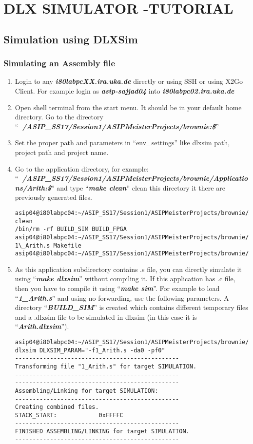 \chapter*{DLX SIMULATOR -TUTORIAL}
\section*{Simulation using DLXSim}
\subsection{Simulating an Assembly file}
\begin{enumerate}
	\item Login to any \emph{\textbf{i80labpcXX.ira.uka.de}} directly or using
	SSH or using X2Go Client. For example login as \emph{\textbf{asip-sajjad04}} into
	\emph{\textbf{i80labpc02.ira.uka.de}}
	\item Open shell terminal from the start menu. It should be in your default
	home directory. Go to the directory
	``\emph{\textbf{~/ASIP\_SS17/Session1/ASIPMeisterProjects/brownie:\$}}''
	\item Set the proper path and parameters in ``env\_settings'' like dlxsim
	path, project path and project name.
	\item Go to the application directory, for example:
	``\emph{\textbf{~/ASIP\_SS17/Session1/ASIPMeisterProjects/brownie/Applications/Arith:\$}}''
	and type ``\emph{\textbf{make clean}}'' clean this directory it there
	are previously generated files.
\begin{lstlisting}
asip04@i80labpc04:~/ASIP_SS17/Session1/ASIPMeisterProjects/brownie/Applications/Arith:$make clean
/bin/rm -rf BUILD_SIM BUILD_FPGA
asip04@i80labpc04:~/ASIP_SS17/Session1/ASIPMeisterProjects/brownie/Applications/Arith:$ls
1\_Arith.s Makefile
asip04@i80labpc04:~/ASIP_SS17/Session1/ASIPMeisterProjects/brownie/Applications/Arith:$
\end{lstlisting}
	\item As this application subdirectory contains .s file, you can directly
	simulate it using ``\emph{\textbf{make dlxsim}}'' without compiling
	it. If this application has .c file, then you have to compile it using
	``\emph{\textbf{make sim}}''. For example to load
	``\emph{\textbf{1\_Arith.s}}'' and using no forwarding, use the
	following parameters. A directory ``\emph{\textbf{BUILD\_SIM}}'' is
	created which contains different temporary files and a .dlxsim file to
	be simulated in dlxsim (in this case it is
	``\emph{\textbf{Arith.dlxsim}}'').
\begin{lstlisting}
asip04@i80labpc04:~/ASIP_SS17/Session1/ASIPMeisterProjects/brownie/Applications/Arith:$make dlxsim DLXSIM_PARAM="-f1_Arith.s -da0 -pf0"
-----------------------------------------------
Transforming file "1_Arith.s" for target SIMULATION.
-----------------------------------------------
-----------------------------------------------
Assembling/Linking for target SIMULATION:
-----------------------------------------------
Creating combined files.
STACK_START:			0xFFFFC
-----------------------------------------------
FINISHED ASSEMBLING/LINKING for target SIMULATION.
-----------------------------------------------



\end{lstlisting}
\end{enumerate}
